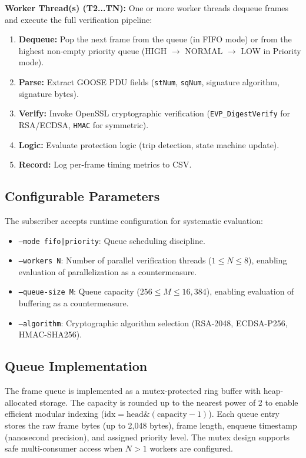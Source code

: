 \documentclass{ieeeaccess}
\begin{document}
\textbf{Worker Thread(s) (T2...TN):} One or more worker threads dequeue frames and execute the full verification pipeline:
\begin{enumerate}[leftmargin=*]
    \item \textbf{Dequeue:} Pop the next frame from the queue (in FIFO mode) or from the highest non-empty priority queue (HIGH $\rightarrow$ NORMAL $\rightarrow$ LOW in Priority mode).
    \item \textbf{Parse:} Extract GOOSE PDU fields (\texttt{stNum}, \texttt{sqNum}, signature algorithm, signature bytes).
    \item \textbf{Verify:} Invoke OpenSSL cryptographic verification (\texttt{EVP\_DigestVerify} for RSA/ECDSA, \texttt{HMAC} for symmetric).
    \item \textbf{Logic:} Evaluate protection logic (trip detection, state machine update).
    \item \textbf{Record:} Log per-frame timing metrics to CSV.
\end{enumerate}

\subsection{Configurable Parameters}
The subscriber accepts runtime configuration for systematic evaluation:
\begin{itemize}[leftmargin=*]
    \item \texttt{--mode fifo|priority}: Queue scheduling discipline.
    \item \texttt{--workers N}: Number of parallel verification threads ($1 \leq N \leq 8$), enabling evaluation of parallelization as a countermeasure.
    \item \texttt{--queue-size M}: Queue capacity ($256 \leq M \leq 16{,}384$), enabling evaluation of buffering as a countermeasure.
    \item \texttt{--algorithm}: Cryptographic algorithm selection (RSA-2048, ECDSA-P256, HMAC-SHA256).
\end{itemize}

\subsection{Queue Implementation}
The frame queue is implemented as a mutex-protected ring buffer with heap-allocated storage. The capacity is rounded up to the nearest power of 2 to enable efficient modular indexing ($\text{idx} = \text{head} \mathbin{\&} (\text{capacity} - 1)$). Each queue entry stores the raw frame bytes (up to 2,048 bytes), frame length, enqueue timestamp (nanosecond precision), and assigned priority level. The mutex design supports safe multi-consumer access when $N > 1$ workers are configured.
\end{document}
